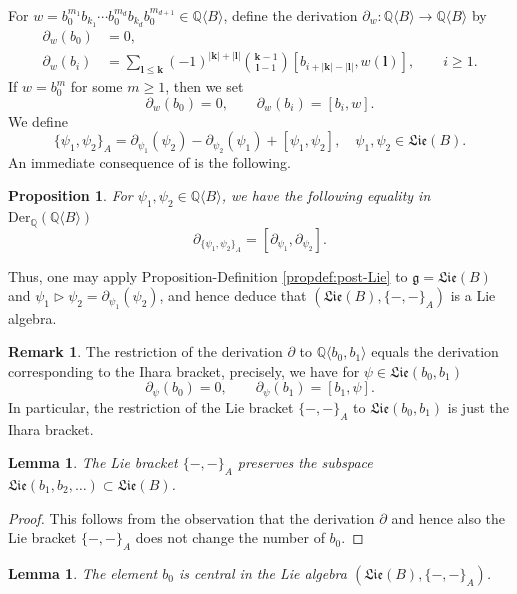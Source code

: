 \documentclass[11pt, a4paper]{amsart}
\newtheorem{proposition}[theorem]{Proposition}
\newtheorem{lemma}[theorem]{Lemma}
\numberwithin{equation}{section}
\theoremstyle{definition}
\newtheorem{remark}[theorem]{Remark}
\newcommand{\Q}{\mathbb{Q}}
\newcommand{\QB}{\Q\langle B\rangle}
\newcommand{\Lie}{\mathfrak{Lie}}
\begin{document}
For $w=b_0^{m_1}b_{k_1}\cdots b_0^{m_d}b_{k_d}b_0^{m_{d+1}} \in \QB$, define the derivation $\partial_w:\QB\to\QB$ by
\begin{align*} %
\partial_w(b_0)&=0, \\ %
\partial_w(b_i)&=\sum_{\mathbf{l}\leq\mathbf{k}} (-1)^{|\mathbf{k}|+|\mathbf{l}|} \binom{\mathbf{k}-1}{\mathbf{l}-1} [b_{i+|\mathbf{k}|-|\mathbf{l}|},w(\mathbf{l})], \qquad i\geq1.
\end{align*}
If $w=b_0^m$ for some $m\geq1$, then we set
\[
\partial_w(b_0)=0,\qquad \partial_w(b_i)=[b_i,w].
\]
We define
\begin{equation*} %
\{\psi_1,\psi_2\}_A=\partial_{\psi_1}(\psi_2)-\partial_{\psi_2}(\psi_1)+[\psi_1,\psi_2],\quad \psi_1,\psi_2\in \Lie(B).
\end{equation*}
An immediate consequence of \cite[Theorem 4.13]{BK25} is the following.
\begin{proposition} %
For $\psi_1, \psi_2 \in \QB$, we have the following equality in $\mathrm{Der}_{\Q}(\QB)$
\[
    \partial_{\{\psi_1, \psi_2\}_A}=[\partial_{\psi_1}, \partial_{\psi_2}].
\]    
\end{proposition}
Thus, one may apply Proposition-Definition \ref{propdef:post-Lie} to $\mathfrak{g}=\Lie(B)$ and $\psi_1 \triangleright \psi_2 = \partial_{\psi_1}(\psi_2)$, and hence deduce that $(\Lie(B),\{-,-\}_A)$ is a Lie algebra.
\begin{remark} \label{rem:bracket_on_b0_b1} The restriction of the derivation $\partial$ to $\Q\langle b_0,b_1\rangle$ equals the derivation corresponding to the Ihara bracket, precisely, we have for $\psi\in \Lie(b_0,b_1)$
\[
\partial_\psi(b_0)=0, \qquad \partial_\psi(b_1)=[b_1,\psi].
\]
In particular, the restriction of the Lie bracket $\{-,-\}_A$ to $\Lie(b_0,b_1)$ is just the Ihara bracket.
\end{remark}
\begin{lemma} \label{lem:bracket_b1b2..}
The Lie bracket $\{-,-\}_A$ preserves the subspace $\Lie(b_1,b_2,\ldots)\subset \Lie(B)$.
\end{lemma}
\begin{proof} This follows from the observation that the derivation $\partial$ and hence also the Lie bracket $\{-,-\}_A$ does not change the number of $b_0$. 
\end{proof}

\begin{lemma} \label{lem:Ari_with_b0}
The element $b_0$ is central in the Lie algebra $(\Lie(B),\{-,-\}_A)$.
\end{lemma}
\end{document}
